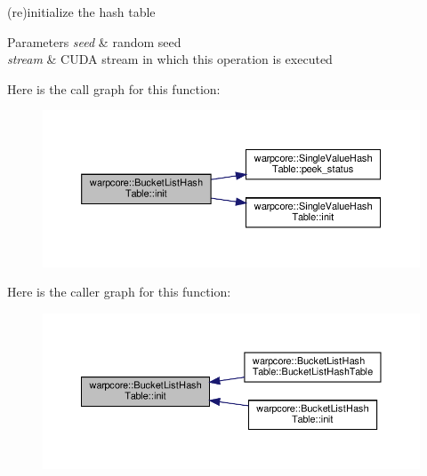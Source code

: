 (re)initialize the hash table 


\begin{DoxyParams}{Parameters}
{\em seed} & random seed \\
\hline
{\em stream} & C\+U\+DA stream in which this operation is executed \\
\hline
\end{DoxyParams}
Here is the call graph for this function\+:
\nopagebreak
\begin{figure}[H]
\begin{center}
\leavevmode
\includegraphics[width=350pt]{classwarpcore_1_1BucketListHashTable_ad819d76bcb890e6ebec9dd9cfa218be3_cgraph}
\end{center}
\end{figure}
Here is the caller graph for this function\+:
\nopagebreak
\begin{figure}[H]
\begin{center}
\leavevmode
\includegraphics[width=350pt]{classwarpcore_1_1BucketListHashTable_ad819d76bcb890e6ebec9dd9cfa218be3_icgraph}
\end{center}
\end{figure}
\mbox{\label{classwarpcore_1_1BucketListHashTable_ad8b42b071bdf053a1ccd42b001212fc6}} 
